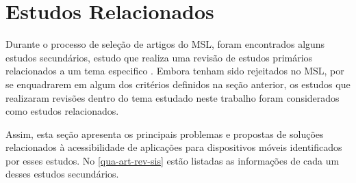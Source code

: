 \section{Estudos Relacionados}

Durante o processo de seleção de artigos do MSL, foram encontrados alguns estudos secundários, estudo que realiza uma revisão de estudos primários relacionados a um tema especifico \cite{Kitchenham2007}.
Embora tenham sido rejeitados no MSL, por se enquadrarem em algum dos critérios definidos na seção anterior, os estudos que realizaram revisões dentro do tema estudado neste trabalho foram considerados como estudos relacionados.

Assim, esta seção apresenta os principais problemas e propostas de soluções relacionados à acessibilidade de aplicações para dispositivos móveis identificados por esses estudos.
No \autoref{qua-art-rev-sis} estão listadas as informações de cada um desses estudos secundários.

